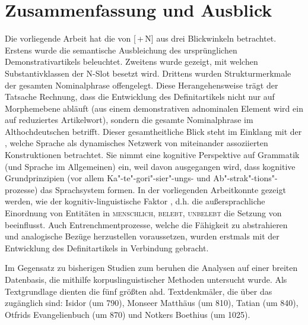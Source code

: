 \chapter{Zusammenfassung und Ausblick}\label{kapitel:zusammenfassung}

Die vorliegende Arbeit hat die  von [\,+\,N] aus drei Blickwinkeln betrachtet. Erstens wurde die semantische Ausbleichung des ursprünglichen Demonstrativartikels  beleuchtet. Zweitens wurde gezeigt, mit welchen Substantivklassen  der N-Slot besetzt wird. Drittens wurden Strukturmerkmale  der gesamten Nominalphrase  offengelegt. 
Diese Herangehensweise trägt der Tatsache Rechnung, dass die Entwicklung des Definitartikels  nicht nur auf Morphemebene  abläuft (aus einem demonstrativen adnominalen Element wird ein auf  reduziertes Artikelwort), sondern die gesamte Nominalphrase  im Althochdeutschen betrifft. Dieser gesamtheitliche Blick steht im Einklang mit der , welche Sprache als dynamisches Netzwerk von miteinander assoziierten Konstruktionen  betrachtet. Sie nimmt eine kognitive Perspektive auf Grammatik (und Sprache im Allgemeinen) ein, weil davon ausgegangen wird, dass kognitive Grundprinzipien (vor allem Ka"-te"-gori"-sier"-ungs- und Ab"-strak"-tions"-prozesse) das Sprachsystem formen. In der vorliegenden Arbeit\linebreak konnte gezeigt werden, wie der kognitiv-linguistische Faktor , d.h. die außersprachliche Einordnung von Entitäten in \textsc{menschlich, belebt, unbelebt} die Setzung von  beeinflusst. Auch  Entrenchmentprozesse, welche die Fähigkeit zu abstrahieren und analogische  Bezüge herzustellen voraussetzen, wurden erstmals mit der Entwicklung des Definitartikels  in Verbindung gebracht.

Im Gegensatz zu bisherigen Studien zum  beruhen die Analysen auf einer breiten Datenbasis, die mithilfe korpuslinguistischer Methoden  untersucht wurde. Als Textgrundlage  dienten die fünf größten ahd. Textdenkmäler, die über das  zugänglich sind: Isidor (um 790), Monseer Matthäus (um 810), Tatian (um 840), Otfrids Evangelienbuch (um 870) und Notkers Boethius (um 1025). 

